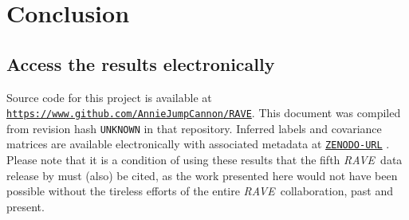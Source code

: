 \documentclass[preprint,trackchanges]{aastex}
\newcommand{\githash}{UNKNOWN}
\newcommand{\project}[1]{\textsl{#1}}
\newcommand{\acronym}[1]{{\small{#1}}}
\newcommand{\rave}{\project{\acronym{RAVE}}}
\newcommand{\logg}{\log g}
\newcommand{\teff}{T_{\mathrm{eff}}}
\newcommand{\Nstars}{483,330}
\begin{document}
\section{Conclusion}
\label{sec:conclusion}



\subsection*{Access the results electronically}

Source code for this project is available at \texttt{\url{https://www.github.com/AnnieJumpCannon/RAVE}}.  
This document was compiled from revision hash \texttt{\githash} in that repository.
Inferred labels and covariance matrices are available electronically with 
associated metadata at \texttt{\url{ZENODO-URL}} \citep{DATA_REPOSITORY}.  
Please note that it is a condition of using these results that the fifth \rave\ 
data release by \citet{Kunder_2016} must (also) be cited, as the work presented 
here would not have been possible without the tireless efforts of the entire 
\rave\ collaboration, past and present.
\end{document}
